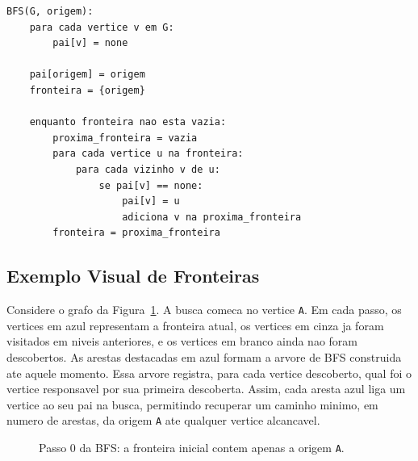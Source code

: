 \begin{lstlisting}
BFS(G, origem):
    para cada vertice v em G:
        pai[v] = none

    pai[origem] = origem
    fronteira = {origem}

    enquanto fronteira nao esta vazia:
        proxima_fronteira = vazia
        para cada vertice u na fronteira:
            para cada vizinho v de u:
                se pai[v] == none:
                    pai[v] = u
                    adiciona v na proxima_fronteira
        fronteira = proxima_fronteira
\end{lstlisting}

\subsection{Exemplo Visual de Fronteiras}

Considere o grafo da Figura~\ref{fig:bfs-step0}. A busca comeca no vertice
\texttt{A}. Em cada passo, os vertices em azul representam a fronteira atual,
os vertices em cinza ja foram visitados em niveis anteriores, e os vertices em
branco ainda nao foram descobertos. As arestas destacadas em azul formam a
arvore de BFS construida ate aquele momento. Essa arvore registra, para cada
vertice descoberto, qual foi o vertice responsavel por sua primeira descoberta.
Assim, cada aresta azul liga um vertice ao seu pai na busca, permitindo recuperar
um caminho minimo, em numero de arestas, da origem \texttt{A} ate qualquer
vertice alcancavel.

\begin{figure}[H]
\centering
{}
\caption{Passo 0 da BFS: a fronteira inicial contem apenas a origem \texttt{A}.}
\label{fig:bfs-step0}
\end{figure}

